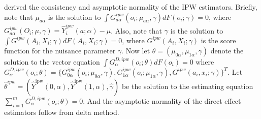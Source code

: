 \documentclass[oupdraft]{biostatistics}
\begin{document}




\citet{PerezHeydrich2014interference} derived the consistency and asymptotic normality of the IPW estimators. 
Briefly, note that $\mu_{a\alpha}$  is the solution to $\int G^{ipw}_{a\alpha}(o_i;\mu_{a\alpha},\gamma)dF(o_i;\gamma) = 0$, where $G^{ipw}_{a\alpha}(O_i;\mu,\gamma) =\widehat{Y}_i^{ipw}(a;\alpha)- \mu$. Also, note that $\gamma$ is the solution to $\int G^{ipw}(A_i,X_i;\gamma)dF(A_i,X_i;\gamma)=0$, where $G^{ipw}(A_i,X_i;\gamma)$ is the score function for the nuisance parameter $\gamma$. Now let $\theta=(\mu_{0\alpha},\mu_{1\alpha},\gamma)$ denote the solution to the vector equation $\int G^{D, ipw}_{\alpha}(o_i;\theta) dF(o_i) = 0$ where $G^{ D,ipw}_{\alpha}(o_i;\theta)=\{G^{ipw}_{0\alpha}(o_i;\mu_{0\alpha},\gamma),G^{ipw}_{1\alpha}(o_i;\mu_{1\alpha},\gamma),G^{ipw}(a_i,x_i;\gamma)\}^T$. Let $\hat\theta^{ipw}=(\hat Y^{\text{ipw}}(0,\alpha),\hat Y^{\text{ipw}}(1,\alpha),\hat\gamma)$ be the solution to the estimating equation $\sum_{i=1}^m G^{D,ipw}_{\alpha}(o_i;\theta)=0$. And the asymptotic normality of the direct effect estimators follow from delta method.

\end{document}
